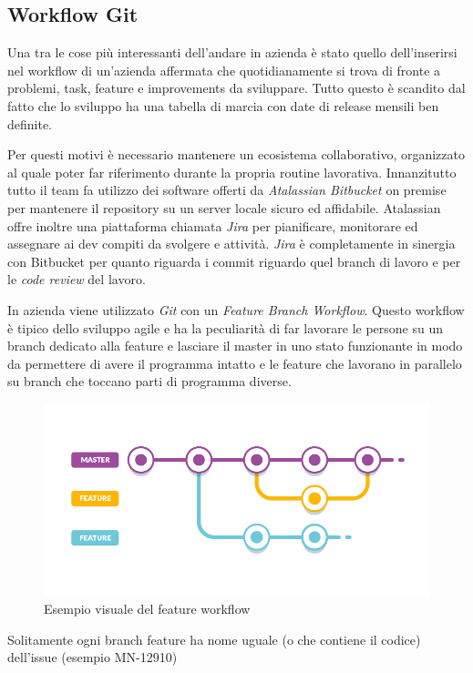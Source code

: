 \documentclass[a4paper]{article}
\begin{document}
\subsection{Workflow Git}
\par Una tra le cose più interessanti dell'andare in azienda è stato quello dell'inserirsi
nel workflow di un'azienda affermata che quotidianamente si trova di fronte a problemi,
task, feature e improvements da sviluppare. Tutto questo è scandito dal fatto che lo sviluppo
ha una tabella di marcia con date di release mensili ben definite.
\par Per questi motivi è necessario mantenere un ecosistema collaborativo, organizzato
al quale poter far riferimento durante la propria routine lavorativa.
Innanzitutto tutto il team fa utilizzo dei software offerti da \emph{Atalassian Bitbucket}
on premise per mantenere il repository su un server locale sicuro ed affidabile.
Atalassian offre inoltre una piattaforma chiamata \emph{Jira} per pianificare, monitorare ed assegnare
ai dev compiti da svolgere e attività. \emph{Jira} è completamente in sinergia con
Bitbucket per quanto riguarda i commit riguardo quel branch di lavoro e per le \emph{code review} 
del lavoro.
\par In azienda viene utilizzato \emph{Git} con un \emph{Feature Branch Workflow}.
Questo workflow è tipico dello sviluppo agile e ha la peculiarità di far lavorare
le persone su un branch dedicato alla feature e lasciare il master in uno stato funzionante
in modo da permettere di avere il programma intatto e le feature che lavorano in parallelo 
su branch che toccano parti di programma diverse.
\begin{figure}[H]
	\includegraphics[width=\textwidth]{feature-branch.png}
	\centering
	\caption{Esempio visuale del feature workflow}
\end{figure}
\par Solitamente ogni branch feature ha nome uguale (o che contiene il codice) dell'issue (esempio MN-12910)
\end{document}
